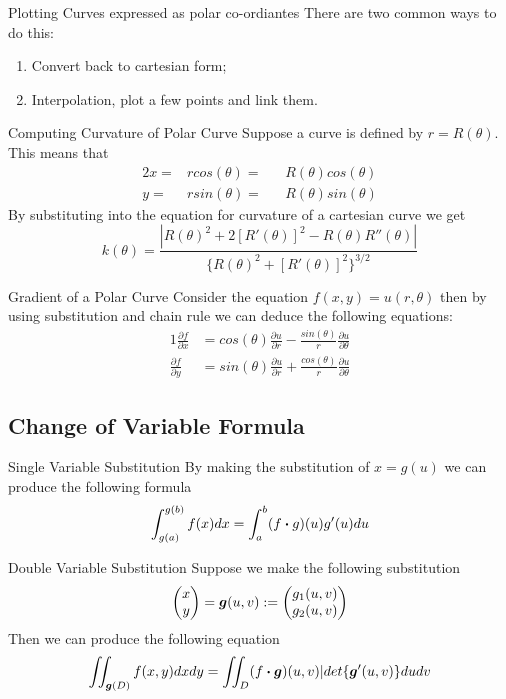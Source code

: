 \documentclass[11pt,a4paper]{article}
\begin{document}
\subtitle{Remark 13.3 - }{Plotting Curves expressed as polar co-ordiantes}
There are two common ways to do this:
\begin{enumerate}[label=\roman*)]
  \item Convert back to cartesian form;
  \item Interpolation, plot a few points and link them.
\end{enumerate}

\subtitle{Theorem 13.4 - }{Computing Curvature of Polar Curve}
Suppose a curve is defined by $r = R(\theta)$. This means that
\begin{alignat*}{2}
  x =& rcos(\theta) =&& R(\theta)cos(\theta) \\
  y =& rsin(\theta) =&& R(\theta)sin(\theta)
\end{alignat*}
By substituting into the equation for curvature of a cartesian curve we get
$$k(\theta) = \frac{|R(\theta)^2 + 2[R'(\theta)]^2 - R(\theta)R''(\theta)|}{\{R(\theta)^2 + [R'(\theta)]^2\}^{3/2}}$$

\subtitle{Theorem 13.5 - }{Gradient of a Polar Curve}
Consider the equation $f(x, y) = u(r, \theta)$ then by using substitution and chain rule we can deduce the following equations:
\begin{alignat*}{1}
  \frac{\partial f}{\partial x} &= cos(\theta)\frac{\partial u}{\partial r} - \frac{sin(\theta)}{r}\frac{\partial u}{\partial \theta} \\
  \frac{\partial f}{\partial y} &= sin(\theta)\frac{\partial u}{\partial r} + \frac{cos(\theta)}{r}\frac{\partial u}{\partial \theta}
\end{alignat*}

\subsection{Change of Variable Formula}

\subtitle{Theorem 13.6 - }{Single Variable Substitution}
By making the substitution of $x = g(u)$ we can produce the following formula
$$\int_{g(a)}^{g(b)}f(x) dx = \int_{a}^{b} (f \boldsymbol{\cdot} g)(u)g'(u)du$$

\subtitle{Theorem 13.6 - }{Double Variable Substitution}
Suppose we make the following substitution $$\begin{pmatrix} x \\ y \end{pmatrix} = \boldsymbol{g}(u, v) := \begin{pmatrix} g_{1}(u, v) \\ g_{2}(u, v) \end{pmatrix}$$
Then we can produce the following equation $$\iint_{\boldsymbol{g}(D)} f(x, y) dx dy = \iint_{D}(f \boldsymbol{\cdot} \boldsymbol{g})(u, v)|det\{\boldsymbol{g}'(u, v)\}dudv$$
\end{document}
